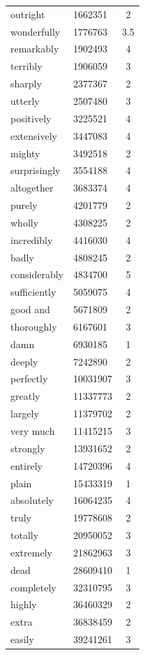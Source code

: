 \documentclass[10pt,letterpaper]{article}
\begin{document}
\begin{table}[ht]
\begin{center}
\begin{tabular}{llc}
    outright & 1662351 & 2 \\ 
    wonderfully & 1776763 & 3.5 \\ 
    remarkably & 1902493 & 4 \\ 
    terribly & 1906059 & 3 \\ 
    sharply & 2377367 & 2 \\ 
    utterly & 2507480 & 3 \\ 
    positively & 3225521 & 4 \\ 
    extensively & 3447083 & 4 \\ 
    mighty & 3492518 & 2 \\ 
    surprisingly & 3554188 & 4 \\ 
    altogether & 3683374 & 4 \\ 
    purely & 4201779 & 2 \\ 
    wholly & 4308225 & 2 \\ 
    incredibly & 4416030 & 4 \\ 
    badly & 4808245 & 2 \\ 
    considerably & 4834700 & 5 \\ 
    sufficiently & 5059075 & 4 \\ 
    good and & 5671809 & 2 \\ 
    thoroughly & 6167601 & 3 \\ 
    damn & 6930185 & 1 \\ 
    deeply & 7242890 & 2 \\ 
    perfectly & 10031907 & 3 \\ 
    greatly & 11337773 & 2 \\ 
    largely & 11379702 & 2 \\ 
    very much & 11415215 & 3 \\ 
    strongly & 13931652 & 2 \\ 
    entirely & 14720396 & 4 \\ 
    plain & 15433319 & 1 \\ 
    absolutely & 16064235 & 4 \\ 
    truly & 19778608 & 2 \\ 
    totally & 20950052 & 3 \\ 
    extremely & 21862963 & 3 \\ 
    dead & 28609410 & 1 \\ 
    completely & 32310795 & 3 \\ 
    highly & 36460329 & 2 \\ 
    extra & 36838459 & 2 \\ 
    easily & 39241261 & 3 \\ 

\end{tabular}
\end{center}
\end{table}
\end{document}
